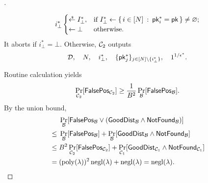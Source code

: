 \begin{proof}[]
\begin{itemize}
\begin{align*}
i_\bot^\ast\begin{cases}
\draws I_\bot^\ast,&\textup{if }
I_\bot^\ast\gets
\{\,
{i\in[N]}
\::\:
{\pk_i^\ast=\pk}
\,\}\neq\varnothing;\\
\gets\bot&\textup{otherwise}.
\end{cases}
\end{align*}
It aborts if ${i_\bot^\ast=\bot}$.
Otherwise, ${\mathcal{C}}_2$ outputs
\begin{align*}
\scriptD,\quad
N,\quad
i_\bot^\ast,\quad
\{\pk_j^\ast\}_{j\in{[N]\setminus{\{i_\bot^\ast\}}}},\quad
1^{1/\epsilon^\ast}.
\end{align*}
\end{itemize}
Routine calculation yields
\begin{align*}
\Pr_{\scriptC_2}[\FalsePos_{\scriptC_2}]
\geq\frac{1}{B^2}\Pr_\scriptB[\FalsePos_\scriptB].
\end{align*}
By the union bound,
\begin{align*}
&
\Pr_\scriptB[\FalsePos_\scriptB\vee(\GoodDist_\scriptB\wedge\NotFound_\scriptB)]
\\{}\leq{}&
\Pr_\scriptB[\FalsePos_\scriptB]
+
\Pr_\scriptB[\GoodDist_\scriptB\wedge\NotFound_\scriptB]
\\{}\leq{}&
B^2\Pr_{\scriptC_2}[\FalsePos_{\scriptC_2}]
+
\Pr_{\scriptC_1}[\GoodDist_{\scriptC_1}\wedge\NotFound_{\scriptC_1}]
\WideNarrow{}{\hspace*{-1em}}
\\{}={}&
(\poly(\lambda))^2\negl(\lambda)+\negl(\lambda)
=
\negl(\lambda).
\qedhere
\end{align*}
\end{proof}
